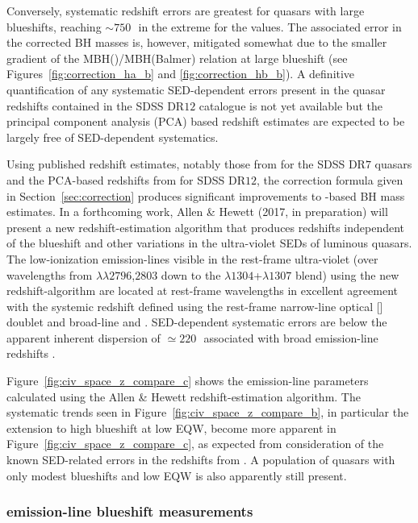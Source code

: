 Conversely, systematic redshift errors are greatest for quasars with large blueshifts, reaching $\sim750$\,\kms\, in the extreme for the \citet{hewett10} values. 
The associated error in the corrected  BH masses is, however, mitigated somewhat due to the smaller gradient of the MBH()/MBH(Balmer) relation at large  blueshift (see Figures~\ref{fig:correction_ha_b} and \ref{fig:correction_hb_b}). 
A definitive quantification of any systematic SED-dependent errors present in the quasar redshifts contained in the SDSS DR$12$ catalogue is not yet available but the principal component analysis (PCA) based redshift estimates are expected to be largely free of SED-dependent systematics. 

Using published redshift estimates, notably those from \citet{hewett10} for the SDSS DR$7$ quasars and the PCA-based redshifts from \citet{paris17} for SDSS DR$12$, the correction formula given in Section~\ref{sec:correction} produces significant improvements to -based BH mass estimates.
In a forthcoming work, Allen \& Hewett (2017, in preparation) will present a new redshift-estimation algorithm that produces redshifts independent of the  blueshift and other variations in the ultra-violet SEDs of luminous quasars.
The low-ionization emission-lines visible in the rest-frame ultra-violet (over wavelengths from $\lambda\lambda$$2796$,$2803$ down to the $\lambda$$1304$+$\lambda$$1307$ blend) using the new redshift-algorithm are located at rest-frame wavelengths in excellent agreement with the systemic redshift defined using the rest-frame narrow-line optical [] doublet and broad-line \hb and \hans.
SED-dependent systematic errors are below the apparent inherent dispersion of $\simeq220$\,\kms\, associated with broad emission-line redshifts \citep{shen16b}.

Figure~\ref{fig:civ_space_z_compare_c} shows the  emission-line parameters calculated using the Allen \& Hewett redshift-estimation algorithm.  
The systematic trends seen in Figure~\ref{fig:civ_space_z_compare_b}, in particular the extension to high blueshift at low  EQW, become more apparent in Figure~\ref{fig:civ_space_z_compare_c}, as expected from consideration of the known SED-related errors in the redshifts from \citet{hewett10}.
A population of quasars with only modest blueshifts and low EQW is also apparently still present. 

\subsubsection{ emission-line blueshift measurements}
\label{sec:ch3-civmeasure}

